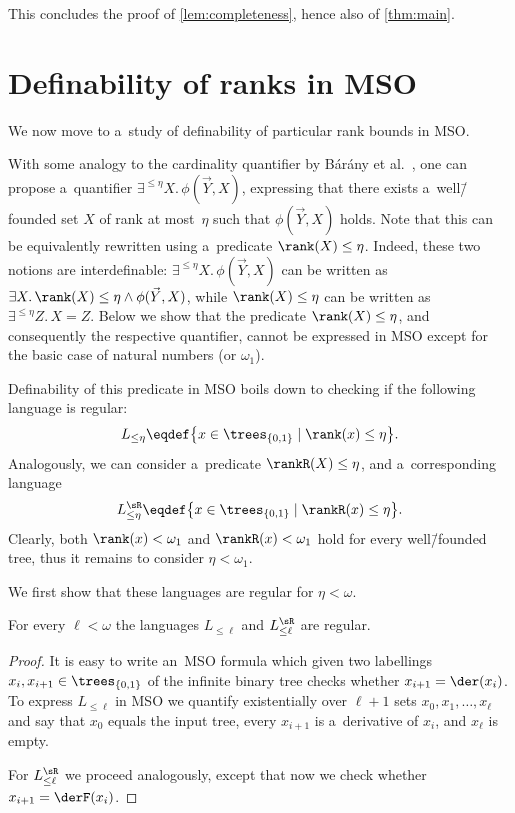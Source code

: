 \documentclass{lmcs}
\numberwithin{equation}{section}
\numberwithin{figure}{section}
\begin{document}
This concludes the proof of \cref{lem:completeness}, hence also of \cref{thm:main}.



\section{Definability of ranks in MSO}
\label{sec:definability}

We now move to a~study of definability of particular rank bounds in MSO.

With some analogy to the cardinality quantifier by B\'ar\'any et al.~\cite{barany_expressing_trees},
one can propose a~quantifier $\exists^{\leq \eta} X.\,\phi(\vec{Y},X)$, expressing that there exists a~well\=/founded set $X$ of rank at most~$\eta$ such that $\phi(\vec{Y},X)$ holds.
Note that this can be equivalently rewritten using a~predicate $\rank(X)\leq \eta$.
Indeed, these two notions are interdefinable: $\exists^{\leq \eta} X.\,\phi(\vec{Y},X)$ can be written as $\exists X.\,\rank(X)\leq \eta\land\phi(\vec{Y},X)$,
while $\rank(X)\leq \eta$ can be written as $\exists^{\leq \eta} Z.\,X=Z$.
Below we show that the predicate $\rank(X)\leq \eta$, and consequently the respective quantifier, cannot be expressed in MSO except for the basic case of natural numbers (or $\omega_1$).

Definability of this predicate in MSO boils down to checking if the following language is regular:
\[L_{\leq\eta}\eqdef \big\{x\in\trees_{\{0,1\}}\mid \rank(x)\leq \eta\big\}.\]
Analogously, we can consider a~predicate $\rankR(X)\leq \eta$, and a~corresponding language
\[L^{\sR}_{\leq\eta}\eqdef \big\{x\in\trees_{\{0,1\}}\mid \rankR(x)\leq \eta\big\}.\]
Clearly, both $\rank(x)<\omega_1$ and $\rankR(x)<\omega_1$ hold for every well\=/founded tree, thus it remains to consider $\eta<\omega_1$.

We first show that these languages are regular for $\eta<\omega$.

\begin{fact}\label{ft:rank-definable}
	For every $\ell<\omega$ the languages $L_{\leq\ell}$ and $L^{\sR}_{\leq\ell}$ are regular.
\end{fact}

\begin{proof}
	It is easy to write an~MSO formula which given two labellings $x_i,x_{i+1}\in\trees_{\{0,1\}}$ of the infinite binary tree checks whether $x_{i+1}=\der(x_i)$.
	To express $L_{\leq\ell}$ in MSO we quantify existentially over $\ell+1$ sets $x_0,x_1,\dots,x_\ell$ and say that $x_0$ equals the input tree,
	every $x_{i+1}$ is a~derivative of $x_i$, and $x_\ell$ is empty.
	
	For $L^{\sR}_{\leq\ell}$ we proceed analogously, except that now we check whether $x_{i+1}=\derF(x_i)$.
\end{proof}
\end{document}

